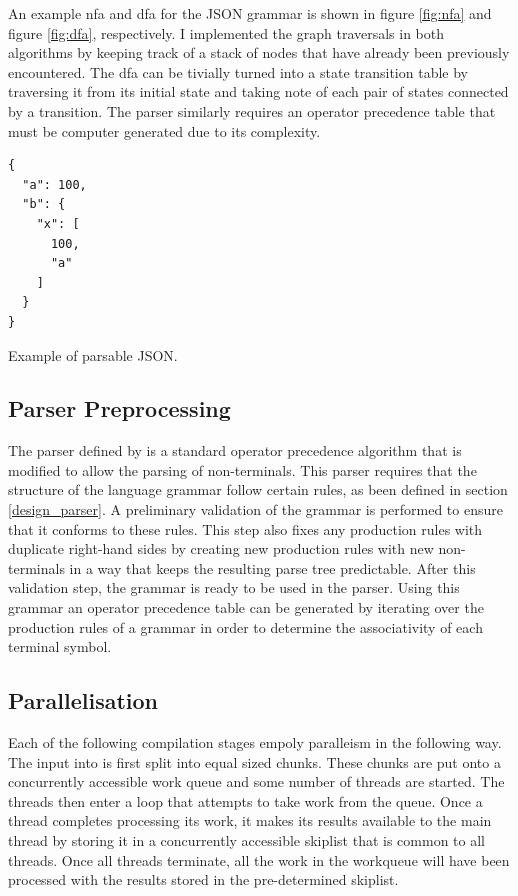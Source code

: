 An example \gls{nfa} and \gls{dfa} for the JSON grammar is shown in figure \ref{fig:nfa} and figure
\ref{fig:dfa}, respectively. I implemented the graph traversals in both algorithms by keeping track
of a stack of nodes that have already been previously encountered. The \gls{dfa} can be tivially
turned into a state transition table by traversing it from its initial state and  taking note of
each pair of states connected by a transition. The parser similarly requires an operator precedence
table that must be computer generated due to its complexity.

\begin{listing}[t]
\begin{verbatim}
{
  "a": 100,
  "b": {
    "x": [
      100,
      "a"
    ]
  }
}
\end{verbatim}
\caption{Example of parsable JSON.}
\hrulefill
\label{lst:json_example}
\end{listing}

\subsection{Parser Preprocessing} 

The parser defined by \cite{barenghi_parallel_2015} is a standard operator precedence algorithm that
is modified to allow the parsing of non-terminals. This parser requires that the structure of the
language grammar follow certain rules, as been defined in section \ref{design_parser}. A preliminary
validation of the grammar is performed to ensure that it conforms to these rules. This step also
fixes any production rules with duplicate right-hand sides by creating new production rules with
new non-terminals in a way that keeps the resulting parse tree predictable. After this validation
step, the grammar is ready to be used in the parser. Using this grammar an operator precedence
table can be generated by iterating over the production rules of a grammar in order to determine the
associativity of each terminal symbol.

\subsection{Parallelisation}

Each of the following compilation stages empoly paralleism in the following way. The input into
is first split into equal sized chunks. These chunks are put onto a concurrently accessible work
queue and some number of threads are started. The threads then enter a loop that attempts to take
work from the queue. Once a thread completes processing its work, it makes its results available to
the main thread by storing it in a concurrently accessible skiplist that is common to all threads.
Once all threads terminate, all the work in the workqueue will have been processed with the results
stored in the pre-determined skiplist.

